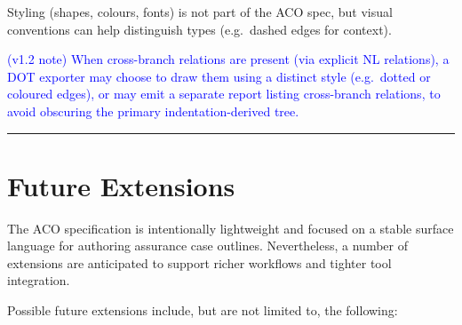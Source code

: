 \documentclass[11pt]{article}
\begin{document}
Styling (shapes, colours, fonts) is not part of the ACO spec, but visual conventions can help distinguish types (e.g.\ dashed edges for context).

\textcolor{blue}{(v1.2 note) When cross-branch relations are present (via explicit NL relations), a DOT exporter may choose to draw them using a distinct style (e.g.\ dotted or coloured edges), or may emit a separate report listing cross-branch relations, to avoid obscuring the primary indentation-derived tree.}

\bigskip
\hrule
\bigskip

\section{Future Extensions}
\label{sec:future-extensions}

The ACO specification is intentionally lightweight and focused on a stable
surface language for authoring assurance case outlines. Nevertheless, a number
of extensions are anticipated to support richer workflows and tighter tool
integration.

Possible future extensions include, but are not limited to, the following:
\end{document}
